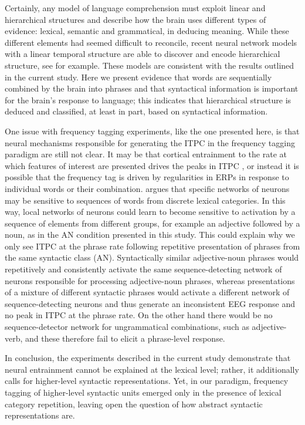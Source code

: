 \documentclass[10pt,letterpaper]{article}
\newcommand{\citet}[1]{\cite{#1}}
\begin{document}
Certainly, any model of language comprehension must exploit linear and hierarchical structures and describe how the brain uses different types of evidence: lexical, semantic and grammatical, in deducing meaning. While these different elements had seemed difficult to reconcile, recent neural network models with a linear temporal structure are able to discover and encode hierarchical structure, see \citet{LakretzEtAl2019,Baroni2019} for example. These models are consistent with the results outlined in the current study. Here we present evidence that words are sequentially combined by the brain into phrases and that syntactical information is important for the brain's response to language; this indicates that hierarchical structure is deduced and classified, at least in part, based on syntactical information.


One issue with frequency tagging experiments, like the one presented here, is that neural mechanisms responsible for generating the ITPC in the frequency tagging paradigm are still not clear. It may be that cortical entrainment to the rate at which features of interest are presented drives the peaks in ITPC \cite{Meyer2018}, or instead it is possible that the frequency tag is driven by regularities in ERPs in response to individual words or their combination. \citet{PulvermullerEtAl2002} argues that specific networks of neurons may be sensitive to sequences of words from discrete lexical categories. In this way, local networks of neurons could learn to become sensitive to activation by a sequence of elements from different groups, for example an adjective followed by a noun, as in the AN condition presented in this study. This could explain why we only see ITPC at the phrase rate following repetitive presentation of phrases from the same syntactic class (AN). Syntactically similar adjective-noun phrases would repetitively and consistently activate the same sequence-detecting network of neurons responsible for processing adjective-noun phrases, whereas presentations of a mixture of different syntactic phrases would activate a different network of sequence-detecting neurons and thus generate an inconsistent EEG response and no peak in ITPC at the phrase rate. On the other hand there would be no sequence-detector network for ungrammatical combinations, such as adjective-verb, and these therefore fail to elicit a phrase-level response. 

In conclusion, the experiments described in the current study demonstrate that neural entrainment cannot be explained at the lexical level; rather, it additionally calls for higher-level syntactic representations. Yet, in our paradigm, frequency tagging of higher-level syntactic units emerged only in the presence of lexical category repetition, leaving open the question of how abstract syntactic representations are.
\end{document}
